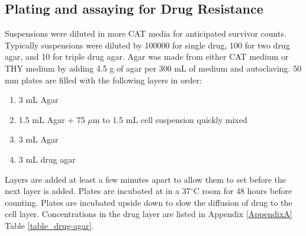 \subsection{Plating and assaying for Drug Resistance}

Suspensions were diluted in more CAT media for anticipated survivor counts.
Typically suspensions were diluted by 100000 for single drug, 100 for two drug agar, and 10 for triple drug agar.
Agar was made from either CAT medium or THY medium by adding 4.5 g of agar per 300 mL of medium and autoclaving.
50 mm plates are filled with the following layers in order: 

\begin{enumerate}
\item 3 mL Agar
\item 1.5 mL Agar + 75 $\mu$m to 1.5 mL cell suspension quickly mixed
\item 3 mL Agar
\item 3 mL drug agar
\end{enumerate}

Layers are added at least a few minutes apart to allow them to set before the next layer is added.
Plates are incubated at in a 37$^{\circ}$C room for 48 hours before counting.
Plates are incubated upside down to slow the diffusion of drug to the cell layer.
Concentrations in the drug layer are listed in Appendix \ref{AppendixA} Table \ref{table_drug-agar}.